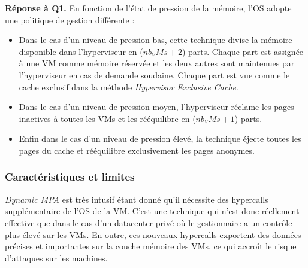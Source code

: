 \par{\textbf{Réponse à Q1.}} En fonction de l'état de pression de la mémoire, l'OS adopte une politique de gestion différente : 
\begin{itemize}
    \item Dans le cas d'un niveau de pression bas, cette technique divise la mémoire disponible dans l'hyperviseur en ($nb_VMs + 2$) parts. Chaque part est assignée à une VM comme mémoire réservée et les deux autres sont maintenues par l'hyperviseur en cas de demande soudaine. Chaque part est vue comme le cache exclusif dans la méthode \textit{Hypervisor Exclusive Cache}.
    \item Dans le cas d'un niveau de pression moyen, l'hyperviseur réclame les pages inactives à toutes les VMs et les rééquilibre en ($nb_VMs + 1$) parts.
    \item Enfin dans le cas d'un niveau de pression élevé, la technique éjecte toutes les pages du cache et rééquilibre exclusivement les pages anonymes.
\end{itemize}

\subsubsection{Caractéristiques et limites}
\textit{Dynamic MPA} est très intusif étant donné qu'il nécessite des hypercalls supplémentaire de l'OS de la VM. C'est une technique qui n'est donc réellement effective que dans le cas d'un datacenter privé où le gestionnaire a un contrôle plus élevé sur les VMs. En outre, ces nouveaux hypercalls exportent des données précises et importantes sur la couche mémoire des VMs, ce qui accroît le risque d'attaques sur les machines.